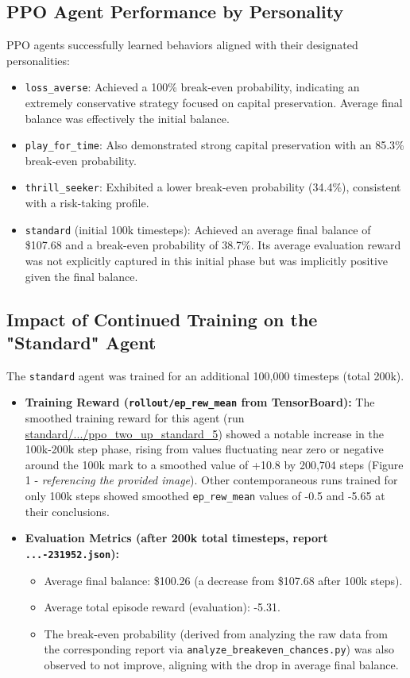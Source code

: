 \documentclass{article}
\begin{document}
\subsection{PPO Agent Performance by Personality}
PPO agents successfully learned behaviors aligned with their designated personalities:
\begin{itemize}
    \item \texttt{loss\_averse}: Achieved a 100\% break-even probability, indicating an extremely conservative strategy focused on capital preservation. Average final balance was effectively the initial balance.
    \item \texttt{play\_for\_time}: Also demonstrated strong capital preservation with an 85.3\% break-even probability.
    \item \texttt{thrill\_seeker}: Exhibited a lower break-even probability (34.4\%), consistent with a risk-taking profile.
    \item \texttt{standard} (initial 100k timesteps): Achieved an average final balance of \$107.68 and a break-even probability of 38.7\%. Its average evaluation reward was not explicitly captured in this initial phase but was implicitly positive given the final balance.
\end{itemize}

\subsection{Impact of Continued Training on the "Standard" Agent}
The \texttt{standard} agent was trained for an additional 100,000 timesteps (total 200k).
\begin{itemize}
    \item \textbf{Training Reward (\texttt{rollout/ep\_rew\_mean} from TensorBoard):} The smoothed training reward for this agent (run \url{standard/.../ppo_two_up_standard_5}) showed a notable increase in the 100k-200k step phase, rising from values fluctuating near zero or negative around the 100k mark to a smoothed value of +10.8 by 200,704 steps (Figure 1 - \textit{referencing the provided image}). Other contemporaneous runs trained for only 100k steps showed smoothed \texttt{ep\_rew\_mean} values of -0.5 and -5.65 at their conclusions.
    \item \textbf{Evaluation Metrics (after 200k total timesteps, report \texttt{...-231952.json}):}
    \begin{itemize}
        \item Average final balance: \$100.26 (a decrease from \$107.68 after 100k steps).
        \item Average total episode reward (evaluation): -5.31.
        \item The break-even probability (derived from analyzing the raw data from the corresponding report via \texttt{analyze\_breakeven\_chances.py}) was also observed to not improve, aligning with the drop in average final balance.
    \end{itemize}
\end{itemize}
\end{document}
